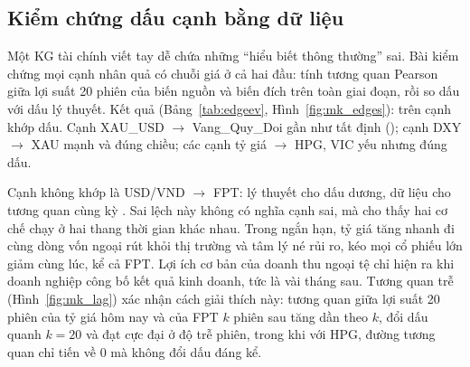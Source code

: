 
\subsection{Kiểm chứng dấu cạnh bằng dữ liệu}\label{sec:kiemchung}
Một KG tài chính viết tay dễ chứa những ``hiểu biết thông thường'' sai. Bài kiểm chứng mọi cạnh nhân quả có chuỗi
giá ở cả hai đầu: tính tương quan Pearson giữa lợi suất 20 phiên của biến nguồn và biến đích trên toàn giai đoạn, rồi
so dấu với dấu lý thuyết. Kết quả (Bảng~\ref{tab:edgeev}, Hình~\ref{fig:mk_edges}):  trên
 cạnh khớp dấu. Cạnh \textsf{XAU\_USD} $\to$ \textsf{Vang\_Quy\_Doi} gần như tất định
(); cạnh DXY $\to$ XAU mạnh và đúng chiều; các cạnh tỷ giá $\to$ HPG, VIC yếu
nhưng đúng dấu.



Cạnh không khớp là USD/VND $\to$ FPT: lý thuyết cho dấu dương, dữ liệu cho tương quan cùng kỳ
. Sai lệch này không có nghĩa cạnh sai, mà cho thấy hai cơ chế chạy ở hai thang thời
gian khác nhau. Trong ngắn hạn, tỷ giá tăng nhanh đi cùng dòng vốn ngoại rút khỏi thị trường và tâm lý né rủi ro, kéo
mọi cổ phiếu lớn giảm cùng lúc, kể cả FPT. Lợi ích cơ bản của doanh thu ngoại tệ chỉ hiện ra khi doanh nghiệp công
bố kết quả kinh doanh, tức là vài tháng sau. Tương quan trễ (Hình~\ref{fig:mk_lag}) xác nhận cách giải thích này:
tương quan giữa lợi suất 20 phiên của tỷ giá hôm nay và của FPT $k$ phiên sau tăng dần theo $k$, đổi dấu quanh
$k = 20$ và đạt cực đại  ở độ trễ  phiên, trong khi với HPG, đường tương
quan chỉ tiến về 0 mà không đổi dấu đáng kể.



